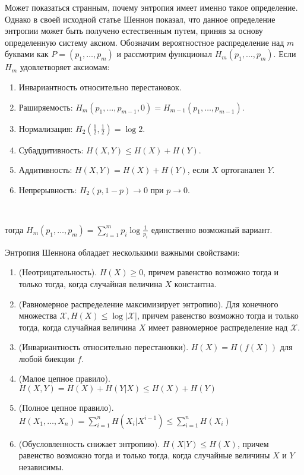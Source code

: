 
Может показаться странным, почему энтропия имеет именно такое определение. Однако в своей исходной статье Шеннон показал, что данное определение энтропии может быть получено естественным путем, приняв за основу определенную систему аксиом. Обозначим вероятностное распределение над $m$ буквами как $P=(p_1, \ldots, p_m)$ и рассмотрим функционал $H_m (p_1, \ldots, p_m)$. Если $H_m$ удовлетворяет аксиомам: \\

\begin{enumerate}
  \item Инвариантность относительно перестановок.
  \item Раширяемость: $H_m (p_1, \ldots, p_{m-1}, 0) = H_{m-1} (p_1, \ldots, p_{m-1})$.
  \item Нормализация: $H_2(\frac{1}{2}, \frac{1}{2}) = \log 2$.
  \item Субаддитивность: $H(X,Y) \leq H(X) + H(Y)$.
  \item Аддитивность: $H(X,Y) = H(X) + H(Y)$, если $X$ ортоганален $Y$.
  \item Непрерывность: $H_2(p, 1-p) \rightarrow 0$ при $p \rightarrow 0$.
\end{enumerate}
\

тогда $H_m (p_1, \ldots, p_m) = \sum_{i=1}^m p_i \log \frac{1}{p_i}$ единственно возможный вариант.


Энтропия Шеннона обладает несколькими важными свойствами: \\

\begin{enumerate}
  \item (Неотрицательность). $H(X) \geq 0$, причем равенство возможно тогда и только тогда, когда случайная величина $X$ константна.
  \item (Равномерное распределение максимизирует энтропию). Для конечного множества $\mathcal{X}, H(X) \leq \log | \mathcal{X} |$, причем равенство возможно тогда и только тогда, когда случайная величина $X$ имеет равномерное распределение над $\mathcal{X}$.
  \item (Инвариантность относительно перестановки). $H(X) = H(f(X))$ для любой биекции $f$.
  \item (Малое цепное правило). $H(X,Y) = H(X) + H(Y|X) \leq H(X) + H(Y)$
  \item (Полное цепное правило). $H(X_1, \ldots, X_n) = \sum_{i=1}^n H(X_i | X^{i-1}) \leq \sum_{i=1}^n H(X_i)$
  \item (Обусловленность снижает энтропию). $H(X|Y) \leq H(X)$, причем равенство возможно тогда и только тогда, когда случайные величины $X$ и $Y$ независимы. 
\end{enumerate}
\


